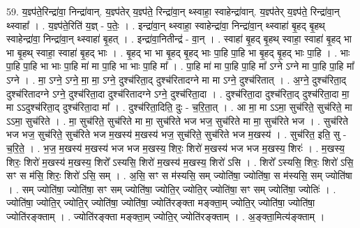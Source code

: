 \documentclass[17pt]{extarticle}
\begin{document}
59. य॒ज्ञ्प॑ते॒रिन्द्रा॑वा॒ निन्द्रा॑वान्. य॒ज्ञ्प॑तेर् य॒ज्ञ्प॑ते॒ रिन्द्रा॑वा॒न् थ्स्वाहा॒ स्वाहेन्द्रा॑वान्. य॒ज्ञ्प॑तेर् य॒ज्ञ्प॑ते॒ रिन्द्रा॑वा॒न् थ्स्वाहा᳚ । . य॒ज्ञ्प॑ते॒रिति॑ य॒ज्ञ् - प॒तेः॒ । . इन्द्रा॑वा॒न् थ्स्वाहा॒ स्वाहेन्द्रा॑वा॒ निन्द्रा॑वा॒न् थ्स्वाहा॑ बृ॒हद् बृ॒हथ् स्वाहेन्द्रा॑वा॒ निन्द्रा॑वा॒न् थ्स्वाहा॑ बृ॒हत् । . इन्द्रा॑वा॒नितीन्द्र॑ - वा॒न् । . स्वाहा॑ बृ॒हद् बृ॒हथ् स्वाहा॒ स्वाहा॑ बृ॒हद् भा भा बृ॒हथ् स्वाहा॒ स्वाहा॑ बृ॒हद् भाः । . बृ॒हद् भा भा बृ॒हद् बृ॒हद् भाः पा॒हि पा॒हि भा बृ॒हद् बृ॒हद् भाः पा॒हि । . भाः पा॒हि पा॒हि भा भाः पा॒हि मा॑ मा पा॒हि भा भाः पा॒हि मा᳚ । . पा॒हि मा॑ मा पा॒हि पा॒हि मा᳚ ऽग्ने ऽग्ने मा पा॒हि पा॒हि मा᳚ ऽग्ने । . मा॒ ऽग्ने॒ ऽग्ने॒ मा॒ मा॒ ऽग्ने॒ दुश्च॑रिता॒द् दुश्च॑रितादग्ने मा मा ऽग्ने॒ दुश्च॑रितात् । . अ॒ग्ने॒ दुश्च॑रिता॒द् दुश्च॑रितादग्ने ऽग्ने॒ दुश्च॑रिता॒दा दुश्च॑रितादग्ने ऽग्ने॒ दुश्च॑रिता॒दा । . दुश्च॑रिता॒दा दुश्च॑रिता॒द् दुश्च॑रिता॒दा मा॒ मा ऽऽदुश्च॑रिता॒द् दुश्च॑रिता॒दा मा᳚ । . दुश्च॑रिता॒दिति॒ दुः - च॒रि॒ता॒त् । . आ मा॒ मा ऽऽमा॒ सुच॑रिते॒ सुच॑रिते॒ मा ऽऽमा॒ सुच॑रिते । . मा॒ सुच॑रिते॒ सुच॑रिते मा मा॒ सुच॑रिते भज भज॒ सुच॑रिते मा मा॒ सुच॑रिते भज । . सुच॑रिते भज भज॒ सुच॑रिते॒ सुच॑रिते भज म॒खस्य॑ म॒खस्य॑ भज॒ सुच॑रिते॒ सुच॑रिते भज म॒खस्य॑ । . सुच॑रित॒ इति॒ सु - च॒रि॒ते॒ । . भ॒ज॒ म॒खस्य॑ म॒खस्य॑ भज भज म॒खस्य॒ शिरः॒ शिरो॑ म॒खस्य॑ भज भज म॒खस्य॒ शिरः॑ । . म॒खस्य॒ शिरः॒ शिरो॑ म॒खस्य॑ म॒खस्य॒ शिरो᳚ ऽस्यसि॒ शिरो॑ म॒खस्य॑ म॒खस्य॒ शिरो॑ ऽसि । . शिरो᳚ ऽस्यसि॒ शिरः॒ शिरो॑ ऽसि॒ सꣳ स म॑सि॒ शिरः॒ शिरो॑ ऽसि॒ सम् । . अ॒सि॒ सꣳ स म॑स्यसि॒ सम् ज्योति॑षा॒ ज्योति॑षा॒ स म॑स्यसि॒ सम् ज्योति॑षा । . सम् ज्योति॑षा॒ ज्योति॑षा॒ सꣳ सम् ज्योति॑षा॒ ज्योति॒र् ज्योति॒र् ज्योति॑षा॒ सꣳ सम् ज्योति॑षा॒ ज्योतिः॑ । . ज्योति॑षा॒ ज्योति॒र् ज्योति॒र् ज्योति॑षा॒ ज्योति॑षा॒ ज्योति॑रङ्क्ता मङ्क्ता॒म् ज्योति॒र् ज्योति॑षा॒ ज्योति॑षा॒ ज्योति॑रङ्क्ताम् । . ज्योति॑रङ्क्ता मङ्क्ता॒म् ज्योति॒र् ज्योति॑रङ्क्ताम् । . अ॒ङ्क्ता॒मित्य॑ङ्क्ताम् । \newline
\pagebreak
{}
\end{document}
